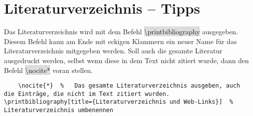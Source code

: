 \documentclass[12pt,	%
				headings=small,		%
				toc=bibliography,	%
			]	%
{scrreprt}		%
\newcommand{\inlinecode}[1]{\colorbox{Gainsboro}{\textsf{\textbackslash#1}}} %
\begin{document}
\section{Literaturverzeichnis – Tipps}
Das Literaturverzeichnis wird mit dem Befehl \inlinecode{printbibliography} ausgegeben. Diesem Befehl kann am Ende mit eckigen Klammern ein neuer Name für das Literaturverzeichnis mitgegeben werden. Soll auch die gesamte Literatur ausgedruckt werden, selbst wenn diese in dem Text nicht zitiert wurde, dann den Befehl \inlinecode{nocite{*}} voran stellen.

\begin{lstlisting}
	\nocite{*}	%	Das gesamte Literaturverzeichnis ausgeben, auch die Einträge, die nicht im Text zitiert wurden.
\printbibliography[title={Literaturverzeichnis und Web-Links}]	% Literaturverzeichnis umbenennen
\end{lstlisting}

\label{sec:LiteraturverzeichnisTipps}




\nocite{*}	%

\printbibliography[title={Literaturverzeichnis und Web-Links}]	%
	
\end{document}
